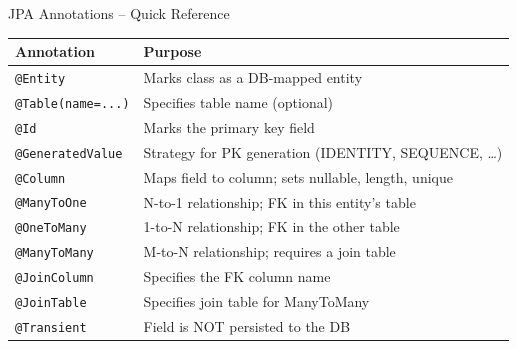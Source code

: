 \begin{frame}[fragile]{JPA Annotations -- Quick Reference}
  \begin{center}
  \renewcommand{\arraystretch}{1.3}
  \begin{tabular}{@{}ll@{}}
    \toprule
    \textbf{Annotation} & \textbf{Purpose} \\
    \midrule
    \texttt{@Entity}               & Marks class as a DB-mapped entity \\
    \texttt{@Table(name=...)}      & Specifies table name (optional) \\
    \texttt{@Id}                   & Marks the primary key field \\
    \texttt{@GeneratedValue}       & Strategy for PK generation (IDENTITY, SEQUENCE, \ldots) \\
    \texttt{@Column}               & Maps field to column; sets nullable, length, unique \\
    \texttt{@ManyToOne}            & N-to-1 relationship; FK in this entity's table \\
    \texttt{@OneToMany}            & 1-to-N relationship; FK in the other table \\
    \texttt{@ManyToMany}           & M-to-N relationship; requires a join table \\
    \texttt{@JoinColumn}           & Specifies the FK column name \\
    \texttt{@JoinTable}            & Specifies join table for ManyToMany \\
    \texttt{@Transient}            & Field is NOT persisted to the DB \\
    \bottomrule
  \end{tabular}
  \end{center}
\end{frame}

